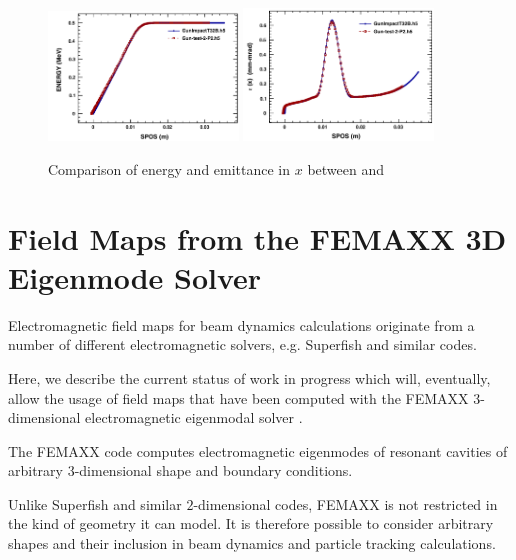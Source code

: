 \begin{figure}[!htb]
\centering
   \includegraphics[width=0.45\textwidth]{figures/Gun/GunCompEn}
   \hspace{0.05\textwidth}
   \includegraphics[width=0.45\textwidth]{figures/Gun/GunCompEx}
   \caption{Comparison of energy and emittance in $x$ between \impactt and \opalt}
   \label{fig:guncomp1}
\end{figure}

\section{Field Maps from the FEMAXX 3D Eigenmode Solver}
Electromagnetic field maps for beam dynamics calculations originate from a number of different
electromagnetic solvers, e.g. Superfish and similar codes.

Here, we describe the current status of work in progress which will, eventually,
allow the usage of field maps that have been computed with the FEMAXX $3$-dimensional
electromagnetic eigenmodal solver \cite{bib:arbenzetal2001,bib:arbenzetal2006}.

The FEMAXX code computes electromagnetic eigenmodes of resonant cavities of
arbitrary $3$-dimensional shape and boundary conditions.

Unlike Superfish and similar $2$-dimensional codes, FEMAXX is not restricted in the
kind of geometry it can model. It is therefore possible to consider arbitrary
shapes and their inclusion in beam dynamics and particle tracking calculations.

